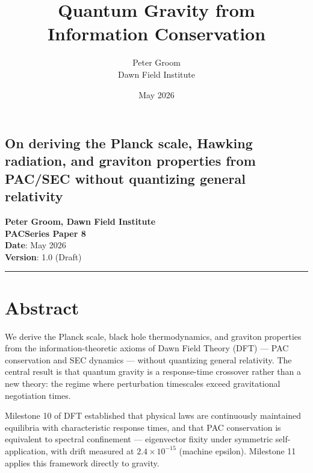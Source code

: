 \documentclass[11pt,a4paper]{article}
\title{Quantum Gravity from Information Conservation}
\author{Peter Groom \\ Dawn Field Institute}
\date{May 2026}
\begin{document}
\maketitle

\subsection*{On deriving the Planck scale, Hawking radiation, and graviton properties from PAC/SEC without quantizing general relativity}

\textbf{Peter Groom, Dawn Field Institute} \\
\textbf{PACSeries Paper 8} \\
\textbf{Date}: May 2026 \\
\textbf{Version}: 1.0 (Draft)

\begin{center}\rule{0.5\linewidth}{0.4pt}\end{center}

\section*{Abstract}

We derive the Planck scale, black hole thermodynamics, and graviton properties from the information-theoretic axioms of Dawn Field Theory (DFT) — PAC conservation and SEC dynamics — without quantizing general relativity. The central result is that quantum gravity is a response-time crossover rather than a new theory: the regime where perturbation timescales exceed gravitational negotiation times.

Milestone 10 of DFT established that physical laws are continuously maintained equilibria with characteristic response times, and that PAC conservation is equivalent to spectral confinement — eigenvector fixity under symmetric self-application, with drift measured at $2.4 \times 10^{-15}$ (machine epsilon). Milestone 11 applies this framework directly to gravity.
\end{document}
